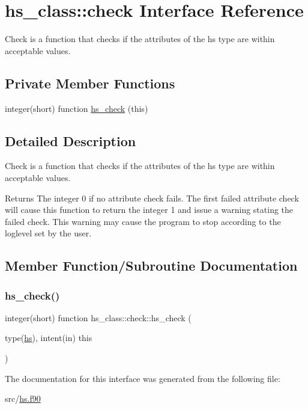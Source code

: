 \hypertarget{interfacehs__class_1_1check}{}\section{hs\+\_\+class\+:\+:check Interface Reference}
\label{interfacehs__class_1_1check}


Check is a function that checks if the attributes of the hs type are within acceptable values.  


\subsection*{Private Member Functions}
\begin{DoxyCompactItemize}
\item 
integer(short) function \hyperlink{interfacehs__class_1_1check_a5109e86865a66c671c91e253adea4ac1}{hs\+\_\+check} (this)
\end{DoxyCompactItemize}


\subsection{Detailed Description}
Check is a function that checks if the attributes of the hs type are within acceptable values. 

\begin{DoxyReturn}{Returns}
The integer 0 if no attribute check fails. The first failed attribute check will cause this function to return the integer 1 and issue a warning stating the failed check. This warning may cause the program to stop according to the loglevel set by the user. 
\end{DoxyReturn}


\subsection{Member Function/\+Subroutine Documentation}
\mbox{\label{interfacehs__class_1_1check_a5109e86865a66c671c91e253adea4ac1}} 
\subsubsection{\texorpdfstring{hs\+\_\+check()}{hs\_check()}}
{\footnotesize\ttfamily integer(short) function hs\+\_\+class\+::check\+::hs\+\_\+check (\begin{DoxyParamCaption}\item[{type(\hyperlink{strucths__class_1_1hs}{hs}), intent(in)}]{this }\end{DoxyParamCaption})\hspace{0.3cm}{\ttfamily [private]}}



The documentation for this interface was generated from the following file\+:\begin{DoxyCompactItemize}
\item 
src/\hyperlink{hs_8f90}{hs.\+f90}\end{DoxyCompactItemize}
